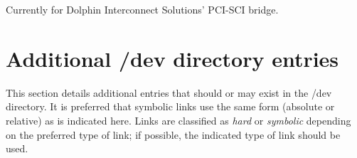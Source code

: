\begin{devicelist}
\end{devicelist}

\begin{devicelist}
	\minordots
\end{devicelist}

\noindent
Currently for Dolphin Interconnect Solutions' PCI-SCI bridge.

\begin{devicelist}
\end{devicelist}

\begin{devicelist}
\end{devicelist}

\begin{devicelist}
\end{devicelist}

\begin{devicelist}
\end{devicelist}

\begin{devicelist}
\end{devicelist}

\section{Additional /dev directory entries}

This section details additional entries that should or may exist in the
{\file /dev} directory.  It is preferred that symbolic links use the
same form (absolute or relative) as is indicated here.  Links are
classified as {\em hard\/} or {\em symbolic\/} depending on the
preferred type of link; if possible, the indicated type of link should
be used.


